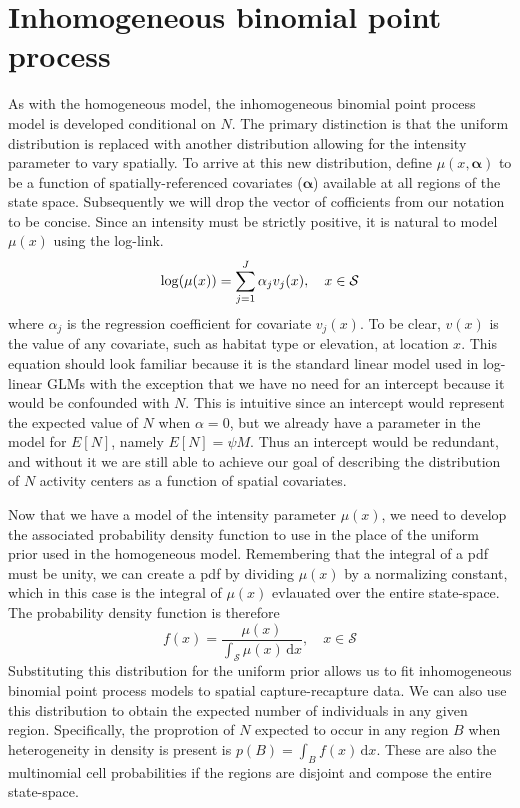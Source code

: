 \section{Inhomogeneous binomial point process}

As with the homogeneous model, the inhomogeneous binomial point process
model is developed conditional on $N$. The primary distinction is that
the uniform distribution is replaced with another distribution
allowing for the intensity parameter to vary spatially. To arrive at
this new distribution, define $\mu(x,\mathbf{\alpha})$ to be a function of
spatially-referenced covariates ($\mathbf{\alpha}$) available at all regions of the state
space.  Subsequently we will drop the vector of cofficients from our
notation to be concise. Since an intensity must be strictly
positive, it is natural to model $\mu(x)$ using the log-link.
\[
\log(\mu(x)) = \sum_{j=1}^J \alpha_j v_j(x), \quad  x \in \cal{S}
\]
where $\alpha_j$ is the regression coefficient for covariate
$v_j(x)$. To be clear, $v(x)$ is the value of any covariate, such as
habitat type or elevation, at location $x$.  This equation should look
familiar because it is the standard linear model used in log-linear
GLMs with the exception that we have no need
for an intercept because it would be confounded with
$N$. This is intuitive since an intercept would
represent the expected value of $N$ when $\alpha=0$, but we already
have a parameter in the model for $E[N]$, namely $E[N] =
\psi M$. Thus an intercept would be
redundant, and without it we are still able to achieve our goal of
describing the distribution of $N$ activity centers as a function of
spatial covariates.

Now that we have a model of the intensity parameter $\mu(x)$,
we need to develop the associated probability density function to use
in the place of the uniform prior used in the homogeneous
model. Remembering that
the integral of a pdf must be unity, we can create a pdf by dividing
$\mu(x)$ by a normalizing constant, which in this case is the integral
of $\mu(x)$ evlauated over the entire
state-space. The probability density function is therefore
\begin{equation}
f(x) = \frac{\mu(x)}{\int_{\mathcal{S}} \mu(x)\, \mathrm{d}x}, \quad x \in
\mathcal{S}
\label{eq:pdf-ipp}
\end{equation}
Substituting this distribution for the
uniform prior allows us to fit inhomogeneous binomial point process
models to spatial capture-recapture data. We can also use this
distribution to obtain the expected number of individuals in any given
region. Specifically, the proprotion of $N$ expected to occur in any
region $B$ when heterogeneity in density is present is $p(B) = \int_B
f(x)\, \mathrm{d}x$. These are
also the multinomial cell probabilities if the regions are
disjoint and compose the entire state-space.

